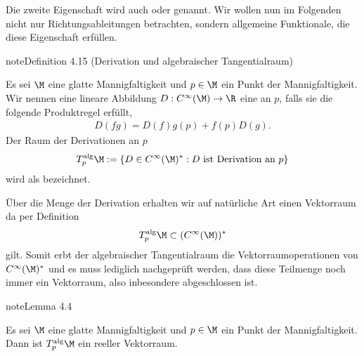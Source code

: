\documentclass[letterpaper,10pt,german]{jupyterBook}
\begin{document}
\sphinxAtStartPar
Die zweite Eigenschaft wird auch  oder  genannt.
Wir wollen nun im Folgenden nicht nur Richtungsableitungen betrachten, sondern allgemeine Funktionale, die diese Eigenschaft erfüllen.
\label{manifolds/tangential:definition-8}
\begin{sphinxadmonition}{note}{Definition 4.15 (Derivation und algebraischer Tangentialraum)}



\sphinxAtStartPar
Es sei \(\M\) eine glatte Mannigfaltigkeit und \(p\in\M\) ein Punkt der Mannigfaltigkeit.
Wir nennen eine lineare Abbildung \(D: C^\infty(\M) \to \R\) eine  an \(p\), falls sie die folgende Produktregel erfüllt,
\begin{equation*}
\begin{split}D(fg) = D(f) g(p) + f(p) D(g).\end{split}
\end{equation*}
\sphinxAtStartPar
Der Raum der Derivationen an \(p\)
\begin{equation*}
\begin{split}T^{\text{alg}}_p\M := \{D\in C^\infty(\M)^\ast: D\text{ ist Derivation an }p\}\end{split}
\end{equation*}
\sphinxAtStartPar
wird als  bezeichnet.
\end{sphinxadmonition}

\sphinxAtStartPar
Über die Menge der Derivation erhalten wir auf natürliche Art einen Vektorraum da per Definition
\begin{equation*}
\begin{split}T^{\text{alg}}_p\M \subset (C^\infty(\M))^\ast\end{split}
\end{equation*}
\sphinxAtStartPar
gilt.
Somit erbt der algebraischer Tangentialraum die Vektorraumoperationen von \(C^\infty(\M)^\ast\) und es muss lediglich nachgeprüft werden, dass diese Teilmenge noch immer ein Vektorraum, also inbesondere abgeschlossen ist.
\label{manifolds/tangential:lemma-9}
\begin{sphinxadmonition}{note}{Lemma 4.4}



\sphinxAtStartPar
Es sei \(\M\) eine glatte Mannigfaltigkeit und \(p\in\M\) ein Punkt der Mannigfaltigkeit.
Dann ist \(T^{\text{alg}}_p\M\) ein reeller Vektorraum.
\end{sphinxadmonition}
\end{document}
